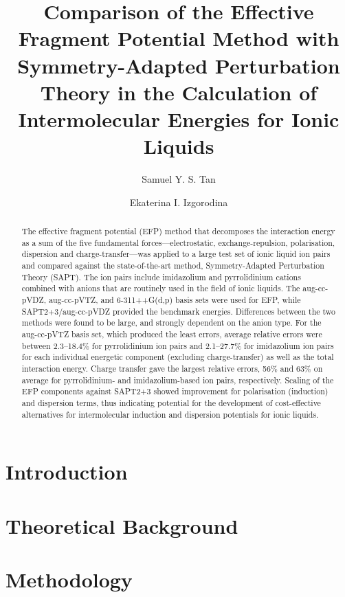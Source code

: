 \documentclass[journal=jctcce]{achemso}
\title{Comparison of the Effective Fragment Potential Method with Symmetry-Adapted Perturbation Theory in the Calculation of Intermolecular Energies for Ionic Liquids}
\author{Samuel Y. S. Tan}
\author{Ekaterina I. Izgorodina}
\affiliation[Monash University]
    {School of Chemistry, Monash University, 17 Rainforest Walk, Clayton, Victoria 3800, AUSTRALIA}
\newcommand{\enUnit}{kJ$ \cdot \text{mol}^{-1}$}
\newcommand{\ipair}[3]{
    \IfEqCase{#3} {
        {bfl} {\ensuremath{[ \text{C}_{\text{#2}}\text{#1}] [ \text{BF}_4 ]}}  
        {br} {\ensuremath{[ \text{C}_{\text{#2}}\text{#1}] [ \text{Br} ]}}
        {cl} {\ensuremath{[ \text{C}_{\text{#2}}\text{#1}] [ \text{Cl} ]}}
        {dca} {\ensuremath{[ \text{C}_{\text{#2}}\text{#1}] [ \text{Dca} ]}}
        {mes} {\ensuremath{[ \text{C}_{\text{#2}}\text{#1}] [ \text{Mes} ]}}
        {ntf} {\ensuremath{[ \text{C}_{\text{#2}}\text{#1}] [ \text{NTf}_{2} ]}} 
        {pf} {\ensuremath{[ \text{C}_{\text{#2}}\text{#1}] [ \text{PF}_6 ]}}
        {tos} {\ensuremath{[ \text{C}_{\text{#2}}\text{#1}] [ \text{Tos} ]}}   
    } 
    [ \PackageError{ipair}{Undefined option (anion) to ipair: #3}{} ]
}
\begin{document}
\maketitle

\begin{abstract}
    The effective fragment potential (EFP) method that decomposes the interaction energy as a sum of the five fundamental forces---electrostatic, exchange-repulsion, polarisation, dispersion and charge-transfer---was applied to a large test set of ionic liquid ion pairs and compared against the state-of-the-art method, Symmetry-Adapted Perturbation Theory (SAPT).
    The ion pairs include imidazolium and pyrrolidinium cations combined with anions that are routinely used in the field of ionic liquids.
    The aug-cc-pVDZ, aug-cc-pVTZ, and 6-311++G(d,p) basis sets were used for EFP, while SAPT2+3/aug-cc-pVDZ provided the benchmark energies.
    Differences between the two methods were found to be large, and strongly dependent on the anion type. 
    For the aug-cc-pVTZ basis set, which produced the least errors, average relative errors were between 2.3--18.4\% for pyrrolidinium ion pairs and 2.1--27.7\% for imidazolium ion pairs for each individual energetic component (excluding charge-transfer) as well as the total interaction energy.
    Charge transfer gave the largest relative errors, 56\% and 63\% on average for pyrrolidinium- and imidazolium-based ion pairs, respectively.
    Scaling of the EFP components against SAPT2+3 showed improvement for polarisation (induction) and dispersion terms, thus indicating potential for the development of cost-effective alternatives for intermolecular induction and dispersion potentials for ionic liquids. 
    
    
\end{abstract}

\section{Introduction}
\label{sec:intro}


\section{Theoretical Background}
\label{sec:bkgrd}


\section{Methodology}
\label{sec:method}

\end{document}
